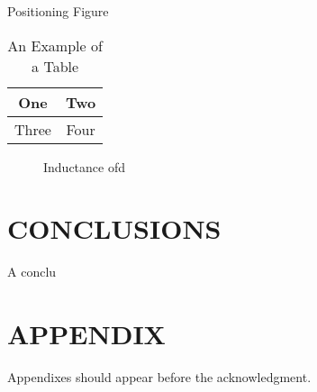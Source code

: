 \documentclass[letterpaper, 10 pt, conference]{ieeeconf}  %
\begin{document}
Positioning Figure



\begin{table}[h]
\caption{An Example of a Table}
\label{table_example}
\begin{center}
\begin{tabular}{|c||c|}
\hline
One & Two\\
\hline
Three & Four\\
\hline
\end{tabular}
\end{center}
\end{table}


   \begin{figure}[thpb]
      \centering
      \caption{Inductance ofd}
      \label{figurelabel}
   \end{figure}




\section{CONCLUSIONS}

A conclu

\addtolength{\textheight}{-12cm}   %







\section*{APPENDIX}

Appendixes should appear before the acknowledgment.
\end{document}
